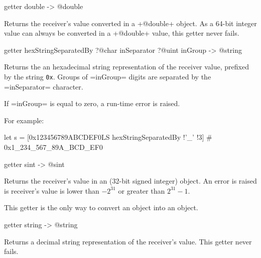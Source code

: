 \begin{galgas}
getter double -> @double
\end{galgas}

Returns the receiver's value converted in a \ggs+@double+ object. As a 64-bit integer value can always be converted in a \ggs+@double+ value, this getter never fails.




\begin{galgas}
getter hexStringSeparatedBy ?@char inSeparator ?@uint inGroup -> @string
\end{galgas}

Returns the an hexadecimal string representation of the receiver value, prefixed by the string \texttt{0x}. Groups of \ggs=inGroup= digits are separated by the \ggs=inSeparator= character.

If \ggs=inGroup= is equal to zero, a run-time error is raised.

For example:
\begin{galgas}
let s = [0x123456789ABCDEF0LS hexStringSeparatedBy !'_' !3] # 0x1_234_567_89A_BCD_EF0
\end{galgas}





\begin{galgas}
getter sint -> @sint
\end{galgas}

Returns the receiver's value in an  (32-bit signed integer) object. An error is raised is receiver's value is lower than $-2^{31}$ or greater than $2^{31}-1$.

This getter is the only way to convert an  object into an  object.






\begin{galgas}
getter string -> @string
\end{galgas}

Returns a decimal string representation of the receiver's value. This getter never fails.









